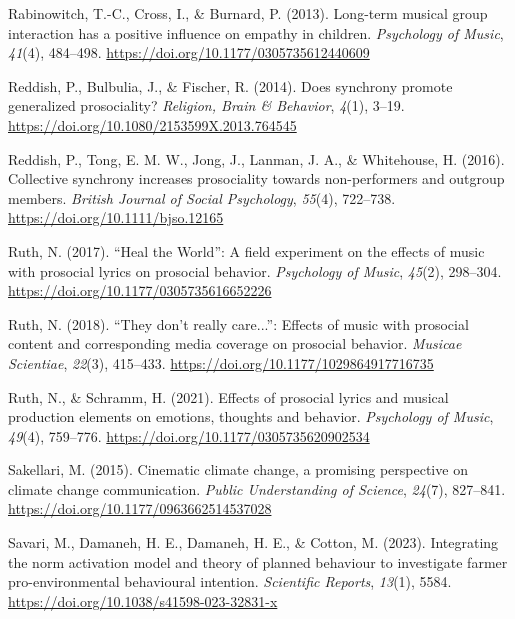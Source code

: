 \documentclass[
  man,floatsintext]{apa6}
\newlength{\cslhangindent}
\newenvironment{CSLReferences}[2] %
 {\begin{list}{}{%
  \setlength{\itemindent}{0pt}
  \setlength{\leftmargin}{0pt}
  \setlength{\parsep}{0pt}
  \ifodd #1
   \setlength{\leftmargin}{\cslhangindent}
   \setlength{\itemindent}{-1\cslhangindent}
  \fi
  \setlength{\itemsep}{#2\baselineskip}}}
 {\end{list}}
\begin{document}
\begin{CSLReferences}{1}{0}
Rabinowitch, T.-C., Cross, I., \& Burnard, P. (2013). Long-term musical group interaction has a positive influence on empathy in children. \emph{Psychology of Music}, \emph{41}(4), 484--498. \url{https://doi.org/10.1177/0305735612440609}

Reddish, P., Bulbulia, J., \& Fischer, R. (2014). Does synchrony promote generalized prosociality? \emph{Religion, Brain \& Behavior}, \emph{4}(1), 3--19. \url{https://doi.org/10.1080/2153599X.2013.764545}

Reddish, P., Tong, E. M. W., Jong, J., Lanman, J. A., \& Whitehouse, H. (2016). Collective synchrony increases prosociality towards non-performers and outgroup members. \emph{British Journal of Social Psychology}, \emph{55}(4), 722--738. \url{https://doi.org/10.1111/bjso.12165}

Ruth, N. (2017). {``{Heal} the {World}''}: {A} field experiment on the effects of music with prosocial lyrics on prosocial behavior. \emph{Psychology of Music}, \emph{45}(2), 298--304. \url{https://doi.org/10.1177/0305735616652226}

Ruth, N. (2018). {``{They} don't really care...''}: {Effects} of music with prosocial content and corresponding media coverage on prosocial behavior. \emph{Musicae Scientiae}, \emph{22}(3), 415--433. \url{https://doi.org/10.1177/1029864917716735}

Ruth, N., \& Schramm, H. (2021). Effects of prosocial lyrics and musical production elements on emotions, thoughts and behavior. \emph{Psychology of Music}, \emph{49}(4), 759--776. \url{https://doi.org/10.1177/0305735620902534}

Sakellari, M. (2015). Cinematic climate change, a promising perspective on climate change communication. \emph{Public Understanding of Science}, \emph{24}(7), 827--841. \url{https://doi.org/10.1177/0963662514537028}

Savari, M., Damaneh, H. E., Damaneh, H. E., \& Cotton, M. (2023). Integrating the norm activation model and theory of planned behaviour to investigate farmer pro-environmental behavioural intention. \emph{Scientific Reports}, \emph{13}(1), 5584. \url{https://doi.org/10.1038/s41598-023-32831-x}


\end{CSLReferences}
\end{document}
